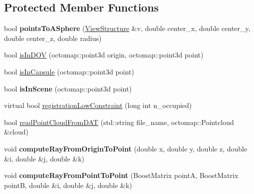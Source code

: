 \subsection*{Protected Member Functions}
\begin{DoxyCompactItemize}
\item 
bool {\bfseries points\+To\+A\+Sphere} (\hyperlink{classViewStructure}{View\+Structure} \&v, double center\+\_\+x, double center\+\_\+y, double center\+\_\+z, double radius)\hypertarget{classPartialModelBase_a926130c2455fb010d50bccc0850494a6}{}\label{classPartialModelBase_a926130c2455fb010d50bccc0850494a6}

\item 
bool \hyperlink{classPartialModelBase_a6f91d65d4a984f3b1ccdd1ac5abfd070}{is\+In\+D\+OV} (octomap\+::point3d origin, octomap\+::point3d point)
\item 
bool \hyperlink{classPartialModelBase_a7336ed5fc1bf4d2e0849d35e0e1070c5}{is\+In\+Capsule} (octomap\+::point3d point)
\item 
bool {\bfseries is\+In\+Scene} (octomap\+::point3d point)\hypertarget{classPartialModelBase_a1b8dc9293182a3524ba9288c949b4943}{}\label{classPartialModelBase_a1b8dc9293182a3524ba9288c949b4943}

\item 
virtual bool \hyperlink{classPartialModelBase_a3e8464488605e9f5ef17a3e641b29429}{registration\+Low\+Constraint} (long int n\+\_\+occupied)
\item 
bool \hyperlink{classPartialModelBase_a7516301463e716f3d5f086315844ca86}{read\+Point\+Cloud\+From\+D\+AT} (std\+::string file\+\_\+name, octomap\+::\+Pointcloud \&cloud)
\item 
void {\bfseries compute\+Ray\+From\+Origin\+To\+Point} (double x, double y, double z, double \&i, double \&j, double \&k)\hypertarget{classPartialModelBase_ad5563edf4a7860474e3a8420f60d4379}{}\label{classPartialModelBase_ad5563edf4a7860474e3a8420f60d4379}

\item 
void {\bfseries compute\+Ray\+From\+Point\+To\+Point} (Boost\+Matrix pointA, Boost\+Matrix pointB, double \&i, double \&j, double \&k)\hypertarget{classPartialModelBase_a922dac8a6cf6799d41d4dabc79695664}{}\label{classPartialModelBase_a922dac8a6cf6799d41d4dabc79695664}

\end{DoxyCompactItemize}
